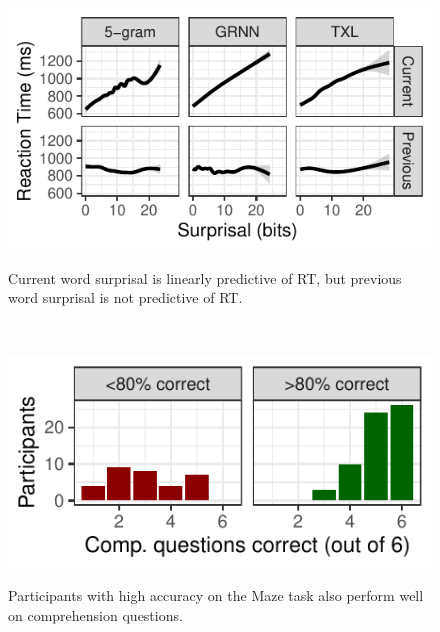 \documentclass[11pt,a4paper]{article}
\begin{document}
\begin{figure}
		\begin{minipage}{.5\textwidth}
		{\center\includegraphics[width=\textwidth]{gam.pdf}\\} 
		\begin{small}
			Current word surprisal is linearly predictive of RT, but previous word surprisal is not predictive of RT.
			
		\end{small}
	\end{minipage}	
	~~~
\begin{minipage}{.5\textwidth}
	{\center\includegraphics[width=\textwidth]{comp.pdf}\\} 
	\begin{small}
		Participants with high accuracy on the Maze task also perform well on comprehension questions. 
		
	\end{small}
\end{minipage}
	
\end{figure}
\end{document}
